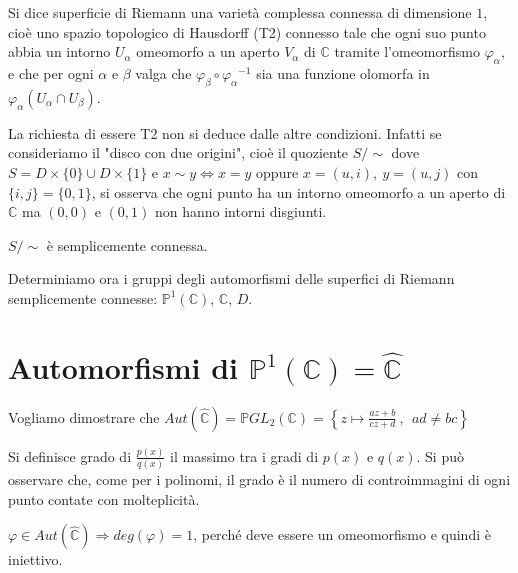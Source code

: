 
\begin{definizione}
Si dice superficie di Riemann una varietà complessa connessa di dimensione $1$, cioè uno spazio topologico di Hausdorff (T2)
connesso tale che ogni suo punto abbia un intorno $U_\alpha$ omeomorfo a un aperto $V_\alpha$ di $\mathbb{C}$
tramite l'omeomorfismo $\varphi_\alpha$, e che per ogni $\alpha$ e $\beta$ valga che $\varphi_\beta \circ {\varphi_\alpha}^{-1}$
sia una funzione olomorfa in $\varphi_\alpha \left( U_\alpha \cap U_\beta \right)$.
\end{definizione}

\begin{osservazione}
La richiesta di essere T2 non si deduce dalle altre condizioni. Infatti se consideriamo il "disco con due origini",
cioè il quoziente $S/\!\!\sim$ dove $S=D\times\{0\} \cup D\times\{1\}$ e $x\sim y \Longleftrightarrow x=y$ oppure $x=(u,i),\ y=(u,j)$ con $\{i,j\}=\{0,1\}$,
si osserva che ogni punto ha un intorno omeomorfo a un aperto di $\mathbb{C}$ ma $(0,0)$ e $(0,1)$ non hanno intorni disgiunti.
\end{osservazione}

\begin{esercizio}
$S/\!\!\sim$ è semplicemente connessa.
\end{esercizio}

Determiniamo ora i gruppi degli automorfismi delle superfici di Riemann semplicemente
connesse: $\mathbb{P}^1(\mathbb{C})$, $\mathbb{C}$, $D$.


\section{Automorfismi di $\mathbb{P}^1(\mathbb{C})=\hat{\mathbb{C}}$}
Vogliamo dimostrare che $Aut( \hat{\mathbb{C}} )= \mathbb{P}GL_2 (\mathbb{C} )=\left\{z\mapsto \displaystyle{\frac{az+b}{cz+d}} \ ,\ \  ad\neq bc\right\}$

\begin{definizione}
Si definisce grado di $\frac{p(x)}{q(x)}$ il massimo tra i gradi di $p(x)$ e $q(x)$.
Si può osservare che, come per i polinomi, il grado è il numero di controimmagini di ogni punto contate con molteplicità.
\end{definizione}

\begin{osservazione}
$\varphi \in Aut( \hat{\mathbb{C}} ) \Longrightarrow deg(\varphi )=1$, perché deve essere un omeomorfismo e quindi è iniettivo.
\end{osservazione}


